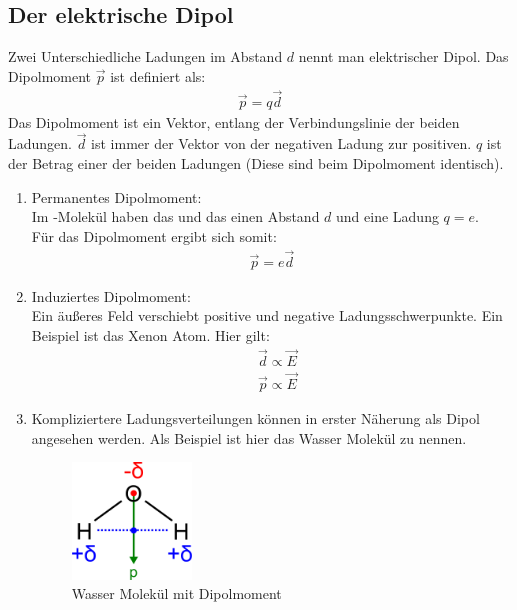 \documentclass{article}
\begin{document}
\subsection{Der elektrische Dipol}
Zwei Unterschiedliche Ladungen im Abstand $d$ nennt man elektrischer Dipol.
Das Dipolmoment $\vec{p}$ ist definiert als:
\begin{align}
    \vec{p}=q\vec{d}
\end{align}
Das Dipolmoment ist ein Vektor, entlang der Verbindungslinie der beiden Ladungen.
$\vec{d}$ ist immer der Vektor von der negativen Ladung zur positiven. $q$ ist der Betrag einer der
beiden Ladungen (Diese sind beim Dipolmoment identisch).
\begin{enumerate}
    \item Permanentes Dipolmoment:\\
    Im -Molekül haben das  und das  einen Abstand $d$ und eine Ladung $q=e$.\\
    Für das Dipolmoment ergibt sich somit:
    \begin{align}
        \vec{p}=e\vec{d}
    \end{align}
    \item Induziertes Dipolmoment:\\
        Ein äußeres Feld verschiebt positive und negative Ladungsschwerpunkte.
        Ein Beispiel ist das Xenon Atom. Hier gilt:
        \begin{align}
            &\vec{d}\propto \vec{E}\\
            &\vec{p}\propto \vec{E}
        \end{align}
    \item Kompliziertere Ladungsverteilungen können in erster Näherung als Dipol angesehen werden. Als Beispiel ist hier 
    das Wasser Molekül zu nennen.
    \begin{figure}[H]
        \centering
        \includegraphics[width=0.3\textwidth]{Dipole_Water.png}
        \caption{Wasser Molekül mit Dipolmoment}
    \end{figure}
\end{enumerate}
\end{document}
